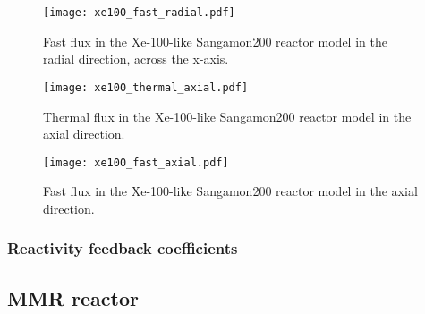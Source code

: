 \begin{figure}
        \centering 
        \texttt{[image: xe100\_fast\_radial.pdf]}
        \caption{Fast flux in the Xe-100-like Sangamon200 
        reactor model in the radial direction, across the 
        x-axis.}
        \label{fig:xe100_fast_radial}
\end{figure}
\begin{figure}
        \centering 
        \texttt{[image: xe100\_thermal\_axial.pdf]}
        \caption{Thermal flux in the Xe-100-like Sangamon200 
        reactor model in the axial direction.}
        \label{fig:xe100_thermal_axial}
\end{figure}
\begin{figure}
        \centering 
        \texttt{[image: xe100\_fast\_axial.pdf]}
        \caption{Fast flux in the Xe-100-like Sangamon200 
        reactor model in the axial direction.}
        \label{fig:xe100_fast_axial}
\end{figure}
\subsubsection{Reactivity feedback coefficients}

\subsection{MMR reactor}